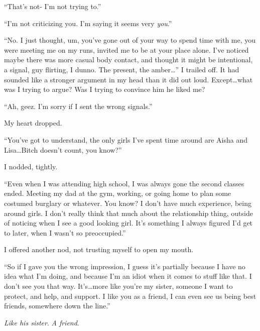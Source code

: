 ``That's not- I'm not trying to.''



``I'm not criticizing you.  I'm saying it seems very \emph{you}.''



``No.  I just thought, um, you've gone out of your way to spend time with me, you were meeting me on my runs, invited me to be at your place alone.  I've noticed maybe there was more casual body contact, and thought it might be intentional, a signal, guy flirting, I dunno.  The present, the amber\ldots'' I trailed off.  It had sounded like a stronger argument in my head than it did out loud.  Except\ldots what was I trying to argue?  Was I trying to convince him he liked me?



``Ah, geez.  I'm sorry if I sent the wrong signals.''



My heart dropped.



``You've got to understand, the only girls I've spent time around are Aisha and Lisa\ldots Bitch doesn't count, you know?''



I nodded, tightly.



``Even when I was attending high school, I was always gone the second classes ended.  Meeting my dad at the gym, working, or going home to plan some costumed burglary or whatever.  You know?  I don't have much experience, being around girls.  I don't really think that much about the relationship thing, outside of noticing when I see a good looking girl.  It's something I always figured I'd get to later, when I wasn't so preoccupied.''



I offered another nod, not trusting myself to open my mouth.



``So if I gave you the wrong impression, I guess it's partially because I have no idea what I'm doing, and because I'm an idiot when it comes to stuff like that.  I don't see you that way.  It's\ldots more like you're my sister, someone I want to protect, and help, and support.  I like you as a friend, I can even see us being best friends, somewhere down the line.''



\emph{Like his sister}.\emph{  A friend}.



